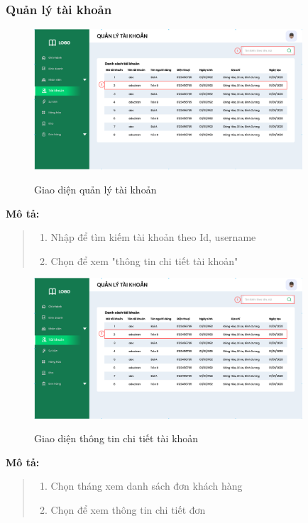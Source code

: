     \subsubsection{Quản lý tài khoản}
        \begin{figure}[!htp]
            \centering
            \includegraphics[width=10cm]{img/UI/admin/account.png}
            \label{29}
            \newline
            \caption{Giao diện quản lý tài khoản}
        \end{figure}
        \textbf{Mô tả:}  
        \begin{quote}
            \begin{enumerate}
                \item Nhập để tìm kiếm tài khoản theo Id, username
                \item Chọn để xem "thông tin chi tiết tài khoản"
            \end{enumerate}
        \end{quote}
            \begin{figure}[!htp]
                \centering
                \includegraphics[width=10cm]{img/UI/admin/account.png}
                \label{30}
                \newline
                \caption{Giao diện thông tin chi tiết tài khoản}
            \end{figure}
            \textbf{Mô tả:}  
            \begin{quote}
                \begin{enumerate}
                    \item Chọn tháng xem danh sách đơn khách hàng
                    \item Chọn để xem thông tin chi tiết đơn
                \end{enumerate}
            \end{quote}
